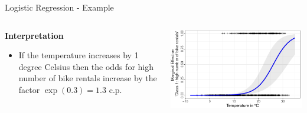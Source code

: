 \documentclass[11pt,compress,t,notes=noshow, aspectratio=169, xcolor=table]{beamer}
\begin{document}
\begin{frame}{Logistic Regression - Example}
\begin{columns}[T]
\begin{column}{0.45\textwidth}
\textbf{Interpretation}
\begin{itemize}
    \item If the temperature increases by 1 degree Celsius then the odds for high number of bike rentals increase by the factor $\exp (0.3) = 1.3$ c.p.
\end{itemize}
\end{column}
\hfill
\begin{column}{0.5\textwidth}
\includegraphics[width = \textwidth]{slides/interpretable-models/figure/logistic_maginal_temp.pdf}
\end{column}
\end{columns}

\end{frame}


\end{document}
